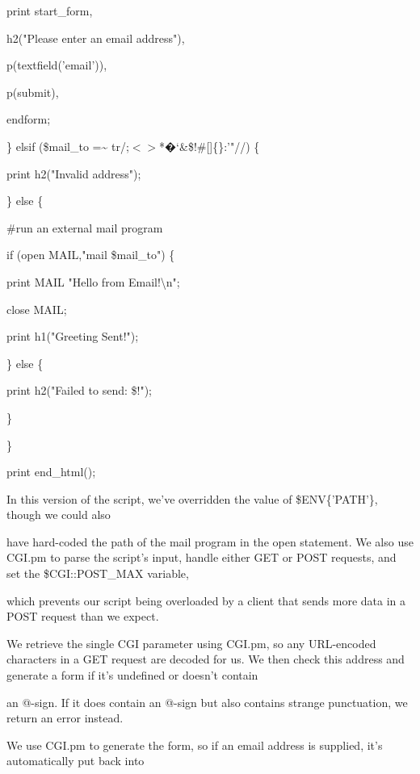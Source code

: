 \documentclass[a4paper,11pt]{book}
\begin{document}
\noindent print start\_form,

\noindent h2("Please enter an email address"),

\noindent p(textfield('email')),

\noindent p(submit),

\noindent endform;

\noindent \} elsif (\$mail\_to =\~{} tr/;$<$$>$*�`\&\$!\#[]\{\}:'"//) \{

\noindent print h2("Invalid address");

\noindent \} else \{

\noindent \#run an external mail program

\noindent if (open MAIL,"\textbar mail \$mail\_to") \{

\noindent print MAIL "Hello from Email!\textbackslash n";

\noindent close MAIL;

\noindent print h1("Greeting Sent!");

\noindent \} else \{

\noindent print h2("Failed to send: \$!");

\noindent \}

\noindent \}

\noindent print end\_html();

\noindent 

\noindent In this version of the  script,  we've  overridden  the  value  of  \$ENV\{'PATH'\},  though  we  could  also

\noindent have hard-coded the path of the  mail program  in  the  open  statement.  We  also  use CGI.pm to  parse the script's input,  handle either  GET  or  POST  requests,  and  set  the \$CGI::POST\_MAX variable,

\noindent which prevents our script being  overloaded  by  a  client  that  sends  more  data  in  a  POST request than we expect.

\noindent 

\noindent We retrieve the single CGI parameter using CGI.pm, so any URL-encoded characters in a GET request are decoded for us. We then check this address and generate a form if it's undefined or doesn't contain

\noindent an @-sign. If it does contain an @-sign but also contains strange punctuation, we return an error instead.

\noindent 

\noindent 

\noindent We use CGI.pm to generate the form, so if an email address is supplied, it's automatically put back into
\end{document}
